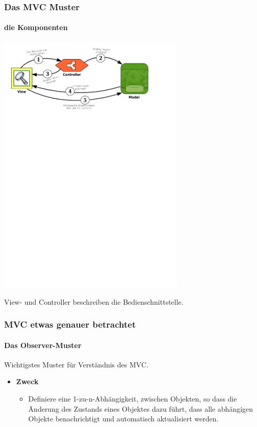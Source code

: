 \begin{frame}
	\frametitle{Das MVC Muster}
	\framesubtitle{die Komponenten}
	\begin{center}
		\includegraphics[trim = 0mm 207.7mm 28.6mm 0mm, clip, width=9cm]{../mvc/mvc-schema.pdf}
	\end{center}
	\begin{center}
		View- und Controller beschreiben die Bedienschnittstelle.
	\end{center}
\end{frame}

\begin{frame}
	\frametitle{MVC etwas genauer betrachtet}
	\framesubtitle{Das Observer-Muster}
	\begin{center}
		 Wichtigstes Muster für Verständnis des MVC.
	\end{center}
	\begin{itemize}
		\item {\bf Zweck}
		\begin{itemize}
			\item Definiere eine 1-zu-n-Abhängigkeit, zwischen Objekten, so dass die Änderung des
			Zustands eines Objektes dazu führt, dass alle abhängigen Objekte benachrichtigt
			und automatisch aktualisiert werden.
		\end{itemize}
	\end{itemize}
\end{frame}

